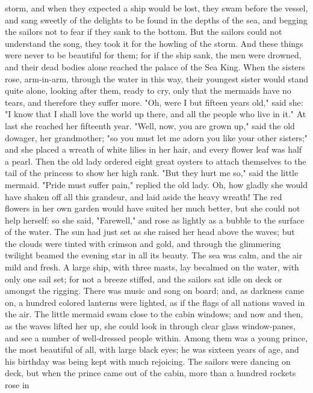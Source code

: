 storm, and when they expected a ship would be lost, they swam before
the vessel, and sang sweetly of the delights to be found in the depths
of the sea, and begging the sailors not to fear if they sank to the
bottom. But the sailors could not understand the song, they took it
for the howling of the storm. And these things were never to be
beautiful for them; for if the ship sank, the men were drowned, and
their dead bodies alone reached the palace of the Sea King.
    When the sisters rose, arm-in-arm, through the water in this
way, their youngest sister would stand quite alone, looking after
them, ready to cry, only that the mermaids have no tears, and
therefore they suffer more. "Oh, were I but fifteen years old," said
she: "I know that I shall love the world up there, and all the
people who live in it."
    At last she reached her fifteenth year. "Well, now, you are
grown up," said the old dowager, her grandmother; "so you must let
me adorn you like your other sisters;" and she placed a wreath of
white lilies in her hair, and every flower leaf was half a pearl. Then
the old lady ordered eight great oysters to attach themselves to the
tail of the princess to show her high rank.
    "But they hurt me so," said the little mermaid.
    "Pride must suffer pain," replied the old lady. Oh, how gladly she
would have shaken off all this grandeur, and laid aside the heavy
wreath! The red flowers in her own garden would have suited her much
better, but she could not help herself: so she said, "Farewell," and
rose as lightly as a bubble to the surface of the water. The sun had
just set as she raised her head above the waves; but the clouds were
tinted with crimson and gold, and through the glimmering twilight
beamed the evening star in all its beauty. The sea was calm, and the
air mild and fresh. A large ship, with three masts, lay becalmed on
the water, with only one sail set; for not a breeze stiffed, and the
sailors sat idle on deck or amongst the rigging. There was music and
song on board; and, as darkness came on, a hundred colored lanterns
were lighted, as if the flags of all nations waved in the air. The
little mermaid swam close to the cabin windows; and now and then, as
the waves lifted her up, she could look in through clear glass
window-panes, and see a number of well-dressed people within. Among
them was a young prince, the most beautiful of all, with large black
eyes; he was sixteen years of age, and his birthday was being kept
with much rejoicing. The sailors were dancing on deck, but when the
prince came out of the cabin, more than a hundred rockets rose in
